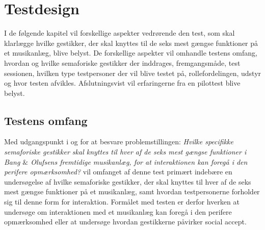 \chapter{Testdesign}
\label{TestdesignValgAfGestikker}
%
I de følgende kapitel vil forskellige aspekter vedrørende den test, som skal klarlægge hvilke gestikker, der skal knyttes til de seks mest gængse funktioner på et musikanlæg, blive belyst. De forskellige aspekter vil omhandle testens omfang, hvordan og hvilke semaforiske gestikker der inddrages, fremgangsmåde, test sessionen, hvilken type testpersoner der vil blive testet på, rollefordelingen, udstyr og hvor testen afvikles. Afslutningsvist vil erfaringerne fra en pilottest blive belyst.   
%

\section{Testens omfang}
\label{TestensOmfangValgAfGestikker}
%
Med udgangspunkt i og for at besvare problemstillingen: \textit{Hvilke specifikke semaforiske gestikker skal knyttes til hver af de seks mest gængse funktioner i Bang $\&$ Olufsens fremtidige musikanlæg, for at interaktionen kan foregå i den perifere opmærksomhed?} vil omfanget af denne test primært indebære en undersøgelse af hvilke semaforiske gestikker, der skal knyttes til hver af de seks mest gængse funktioner på et musikanlæg, samt hvordan testpersonerne forholder sig til denne form for interaktion. Formålet med testen er derfor hverken at undersøge om interaktionen med et musikanlæg kan foregå i den perifere opmærksomhed eller at undersøge hvordan gestikkerne påvirker social accept. 


